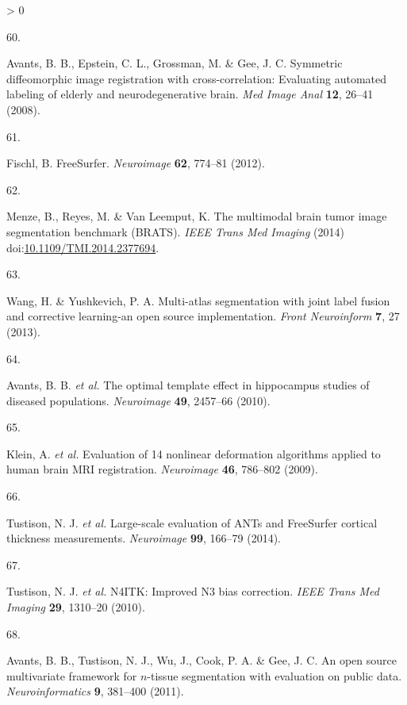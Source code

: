 \documentclass[
  12pt,
]{article}
\newlength{\cslhangindent}
\newlength{\csllabelwidth}
\newenvironment{CSLReferences}[3] %
 {%
  \setlength{\parindent}{0pt}
  \ifodd #1 \everypar{\setlength{\hangindent}{\cslhangindent}}\ignorespaces\fi
  \ifnum #2 > 0
  \setlength{\parskip}{#3\baselineskip}
  \fi
 }%
 {}
\newcommand{\CSLLeftMargin}[1]{\parbox[t]{\maxof{\widthof{#1}}{\csllabelwidth}}{#1}}
\newcommand{\CSLRightInline}[1]{\parbox[t]{\linewidth}{#1}}
\begin{document}
\begin{CSLReferences}{0}{0}
\leavevmode\hypertarget{ref-Avants:2008aa}{}%
\CSLLeftMargin{60. }
\CSLRightInline{Avants, B. B., Epstein, C. L., Grossman, M. \& Gee, J.
C. Symmetric diffeomorphic image registration with cross-correlation:
Evaluating automated labeling of elderly and neurodegenerative brain.
\emph{Med Image Anal} \textbf{12}, 26--41 (2008).}

\leavevmode\hypertarget{ref-Fischl:2012aa}{}%
\CSLLeftMargin{61. }
\CSLRightInline{Fischl, B. {FreeSurfer}. \emph{Neuroimage} \textbf{62},
774--81 (2012).}

\leavevmode\hypertarget{ref-Menze:2014aa}{}%
\CSLLeftMargin{62. }
\CSLRightInline{Menze, B., Reyes, M. \& Van Leemput, K. The multimodal
brain tumor image segmentation benchmark ({BRATS}). \emph{IEEE Trans Med
Imaging} (2014)
doi:\href{https://doi.org/10.1109/TMI.2014.2377694}{10.1109/TMI.2014.2377694}.}

\leavevmode\hypertarget{ref-Wang:2013aa}{}%
\CSLLeftMargin{63. }
\CSLRightInline{Wang, H. \& Yushkevich, P. A. Multi-atlas segmentation
with joint label fusion and corrective learning-an open source
implementation. \emph{Front Neuroinform} \textbf{7}, 27 (2013).}

\leavevmode\hypertarget{ref-Avants:2010aa}{}%
\CSLLeftMargin{64. }
\CSLRightInline{Avants, B. B. \emph{et al.} The optimal template effect
in hippocampus studies of diseased populations. \emph{Neuroimage}
\textbf{49}, 2457--66 (2010).}

\leavevmode\hypertarget{ref-Klein:2009aa}{}%
\CSLLeftMargin{65. }
\CSLRightInline{Klein, A. \emph{et al.} Evaluation of 14 nonlinear
deformation algorithms applied to human brain {MRI} registration.
\emph{Neuroimage} \textbf{46}, 786--802 (2009).}

\leavevmode\hypertarget{ref-Tustison:2014ab}{}%
\CSLLeftMargin{66. }
\CSLRightInline{Tustison, N. J. \emph{et al.} Large-scale evaluation of
{ANTs} and {FreeSurfer} cortical thickness measurements.
\emph{Neuroimage} \textbf{99}, 166--79 (2014).}

\leavevmode\hypertarget{ref-Tustison:2010ac}{}%
\CSLLeftMargin{67. }
\CSLRightInline{Tustison, N. J. \emph{et al.} {N4ITK}: Improved {N3}
bias correction. \emph{IEEE Trans Med Imaging} \textbf{29}, 1310--20
(2010).}

\leavevmode\hypertarget{ref-Avants:2011aa}{}%
\CSLLeftMargin{68. }
\CSLRightInline{Avants, B. B., Tustison, N. J., Wu, J., Cook, P. A. \&
Gee, J. C. An open source multivariate framework for \(n\)-tissue
segmentation with evaluation on public data. \emph{Neuroinformatics}
\textbf{9}, 381--400 (2011).}


\end{CSLReferences}
\end{document}
